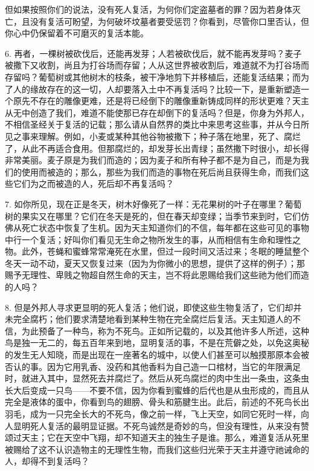 但如果按照你们的说法，没有死人复活，为何你们定盗墓者的罪？因为若身体灭亡，且没有复活可盼望，为何破坏坟墓者要受惩罚？你看到，尽管你口里否认，但你心中仍保留着不可磨灭的复活本能。\par

6. 再者，一棵树被砍伐后，还能再发芽；人若被砍伐后，就不能再发芽吗？麦子被撒下又收割，尚且为打谷场而存留；人从这世界被收割后，难道就不为打谷场而存留吗？葡萄树或其他树木的枝条，被干净地剪下并移植后，还能复活结果；而为了人的缘故存在的这一切，人却要落入土中不再复活吗？比较一下，是重新塑造一个原先不存在的雕像更难，还是将已经倒下的雕像重新铸成同样的形状更难？天主从无中创造了我们，难道不能使那已存在却倒下的复活吗？但是，你身为外邦人，不相信圣经关于复活的记载；那么请从自然界的类比中来思考这些事，并从今日所见之事来理解。例如，小麦或某种其他谷物被撒下；种子落在地里，死了、腐烂了，从此不再适合食用。但那腐烂的，却发芽长出青绿；虽然撒下时很小，却长得非常美丽。麦子原是为我们而造的；因为麦子和所有种子都不是为自己，而是为我们的使用而被造的；那么，那些为我们而造的事物在死后尚且获得生命，而我们这些它们为之而被造的人，死后却不再复活吗？\par

7. 如你所见，现在正是冬天，树木好像死了一样：无花果树的叶子在哪里？葡萄树的果实又在哪里？它们在冬天是死的，但在春天却变绿；当季节来到时，它们仿佛从死亡状态中恢复了生机。因为天主知道你们的不信，每年都在这些可见的事物中行一个复活；好叫你们看见无生命之物所发生的事，从而相信有生命和理性之物。此外，苍蝇和蜜蜂常常淹死在水里，但过一段时间又活过来；冬眠的睡鼠整个冬天一动不动，夏天又恢复过来（因为为你微小的思想，提供了这样的例子）；那赐予无理性、卑贱之物超自然生命的天主，岂不将此恩赐给我们这些祂为他们而造的人吗？\par

8. 但是外邦人寻求更显明的死人复活；他们说，即使这些生物复活了，它们却并未完全腐朽；他们要求清楚地看到某种生物在完全腐烂后复活。天主知道人的不信，为此预备了一种鸟，称为不死鸟。正如所记载的，以及其他许多人所述，这种鸟是独一无二的，每五百年来到地，显明复活的事，不是在荒僻之处，以免这奥秘的发生无人知晓，而是出现在一座著名的城中，以使人们甚至可以触摸那原本会被否认的事。因为它用乳香、没药和其他香料为自己造一口棺材，当它的年限满足时，就进入其中，显然死去并腐烂了。然后从死鸟腐烂的肉中生出一条虫，这条虫长大后变成一只鸟——不要不信，因为你看到蜜蜂的后代也是从虫形成的，而且从完全是液体的蛋中，你看到鸟的翅膀、骨头和筋腱生出。此后，前述的不死鸟长出羽毛，成为一只完全长大的不死鸟，像之前一样，飞上天空，如同它死时一样，向人显明死人复活的最明显证据。不死鸟诚然是奇妙的鸟，但没有理性，从来没有赞颂过天主；它在天空中飞翔，却不知道天主的独生子是谁。那么，难道复活从死里被赐给了这不认识造物主的无理性生物，而我们这些归光荣于天主并遵守祂诫命的人，却得不到复活吗？\par

